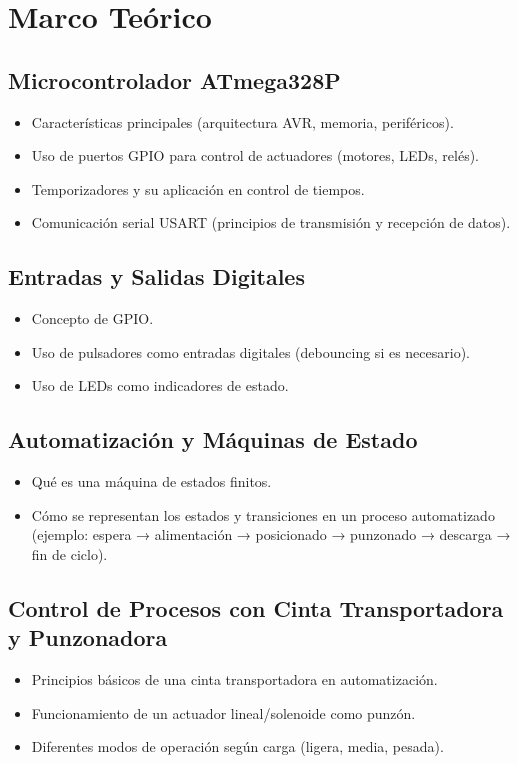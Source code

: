 \section{Marco Teórico}

\subsection{Microcontrolador ATmega328P}
\begin{itemize}
    \item Características principales (arquitectura AVR, memoria, periféricos).
    \item Uso de puertos GPIO para control de actuadores (motores, LEDs, relés).
    \item Temporizadores y su aplicación en control de tiempos.
    \item Comunicación serial USART (principios de transmisión y recepción de datos).
\end{itemize}


\subsection{Entradas y Salidas Digitales}
\begin{itemize}
    \item Concepto de GPIO.
    \item Uso de pulsadores como entradas digitales (debouncing si es necesario).
    \item Uso de LEDs como indicadores de estado.
\end{itemize}


\subsection{Automatización y Máquinas de Estado}
\begin{itemize}
    \item Qué es una máquina de estados finitos.
    \item Cómo se representan los estados y transiciones en un proceso automatizado (ejemplo: espera → alimentación → posicionado → punzonado → descarga → fin de ciclo).
\end{itemize}


\subsection{Control de Procesos con Cinta Transportadora y Punzonadora}
\begin{itemize}
    \item Principios básicos de una cinta transportadora en automatización.
    \item Funcionamiento de un actuador lineal/solenoide como punzón.
    \item Diferentes modos de operación según carga (ligera, media, pesada).
\end{itemize}


